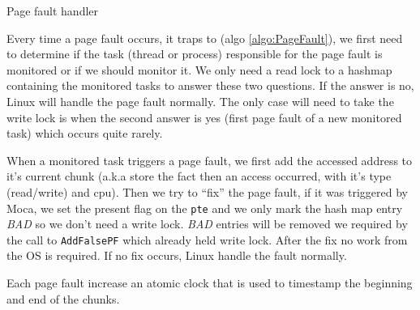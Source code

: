 \begin{algorithm}[htb]
    \caption{Page fault handler}
    \label{algo:PageFault}
    \begin{algorithmic}[1]
                    \State {}
                    \State {}
                    \State \Return
                \EndIf
            \EndIf
            \State {}
            \State {}
                \State {}
            \EndIf
            \State {}
            \State {}
        \EndFunction
    \end{algorithmic}
\end{algorithm}

Every time a page fault occurs, it traps to \Moca (algo
\ref{algo:PageFault}), we first need to determine if the task
(thread or process) responsible for the page fault is
monitored or if we should monitor it. We only need a read lock
to a hashmap containing the monitored tasks to answer these
two questions. If the answer is no, Linux will handle the page
fault normally. The only case will need to take the write lock
is when the second answer is yes (first page fault of a new
monitored task) which occurs quite rarely.

When a monitored task triggers a page fault, we first add the
accessed address to it's current chunk (a.k.a store the fact
then an access occurred, with it's type (read/write) and cpu).
Then we try to ``fix'' the page fault, if it was triggered by
Moca, we set the present flag on the \texttt{pte} and we only mark the hash
map entry \emph{BAD} so we don't need a write lock. \emph{BAD} entries will be
removed we required by the call to \texttt{AddFalsePF} which already held
write lock. After the fix no work from the OS is required. If no fix occurs,
Linux handle the fault normally.

Each page fault increase an atomic clock that is used to timestamp the
beginning and end of the chunks.


